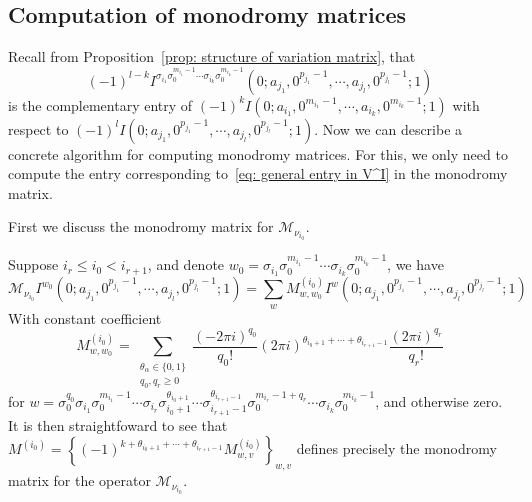 \subsection{Computation of monodromy matrices}

Recall from Proposition~\ref{prop: structure of variation matrix}, that
\begin{equation}\label{eq: general entry in V^I}
(-1)^{l-k}I^{\sigma_{i_1}\sigma_0^{m_{i_1}-1}\cdots\sigma_{i_k}\sigma_0^{m_{i_k}-1}}(0;a_{j_1},0^{p_{j_1}-1},\cdots,a_{j_l},0^{p_{j_l}-1};1)
\end{equation}
is the complementary entry of $(-1)^kI(0;a_{i_1},0^{m_{i_1}-1},\cdots,a_{i_k},0^{m_{i_k}-1};1)$ with respect to $(-1)^lI(0;a_{j_1},0^{p_{j_1}-1},\cdots,a_{j_l},0^{p_{j_l}-1};1)$. Now we can describe a concrete algorithm for computing monodromy matrices. For this, we only need to compute the entry corresponding to~\eqref{eq: general entry in V^I} in the monodromy matrix.

First we discuss the monodromy matrix for $\mathcal M_{\nu_{i_0}}$.

\begin{theorem}
Suppose $i_r\leq i_0<i_{r+1}$, and denote $w_0=\sigma_{i_1}\sigma_0^{m_{i_1}-1}\cdots\sigma_{i_k}\sigma_0^{m_{i_k}-1}$, we have
\begin{equation}
\mathcal M_{\nu_{i_0}}I^{w_0}(0;a_{j_1},0^{p_{j_1}-1},\cdots,a_{j_l},0^{p_{j_l}-1};1)=\sum_{w}M^{(i_0)}_{w,w_0}I^{w}(0;a_{j_1},0^{p_{j_1}-1},\cdots,a_{j_l},0^{p_{j_l}-1};1)
\end{equation}
With constant coefficient
\begin{equation}
M^{(i_0)}_{w,w_0}=\sum_{\substack{\theta_\alpha\in\{0,1\}\\q_0,q_r\geq0}}\frac{(-2\pi i)^{q_0}}{q_0!}(2\pi i)^{\theta_{i_0+1}+\cdots+\theta_{i_{r+1}-1}}\frac{(2\pi i)^{q_r}}{q_r!}
\end{equation}
for $w=\sigma_0^{q_0}\sigma_{i_1}\sigma_0^{m_{i_1}-1}\cdots\sigma_{i_r}\sigma_{i_0+1}^{\theta_{i_0+1}}\cdots\sigma_{i_{r+1}-1}^{\theta_{i_{r+1}-1}}\sigma_0^{m_{i_r}-1+q_r}\cdots\sigma_{i_k}\sigma_0^{m_{i_k}-1}$, and otherwise zero. It is then straightfoward to see that $M^{(i_0)}=\left\{(-1)^{k+\theta_{i_0+1}+\cdots+\theta_{i_{r+1}-1}}M^{(i_0)}_{w,v}\right\}_{w,v}$ defines precisely the monodromy matrix for the operator $\mathcal M_{\nu_{i_0}}$.
\end{theorem}

